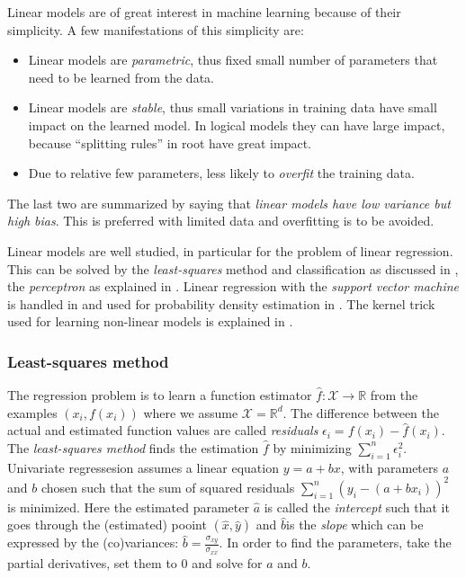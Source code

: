 Linear models are of great interest in machine learning because of their simplicity.
A few manifestations of this simplicity are:
\begin{itemize}
  \item Linear models are \emph{parametric}, thus fixed small number of parameters that need to be learned from the data.
  \item Linear models are \emph{stable}, thus small variations in training data have small impact on the learned model. In logical models they can have large impact, because ``splitting rules'' in root have great impact.
  \item Due to relative few parameters, less likely to \emph{overfit} the training data.
\end{itemize}

The last two are summarized by saying that \emph{linear models have low variance but high bias}.
This is preferred with limited data and overfitting is to be avoided.

Linear models are well studied, in particular for the problem of linear regression.
This can be solved by the \emph{least-squares} method and classification as discussed in , the \emph{perceptron} as explained in .
Linear regression with the \emph{support vector machine} is handled in  and used for probability density estimation in .
The kernel trick used for learning non-linear models is explained in .


\subsubsection{Least-squares method}\label{least-squares}
The regression problem is to learn a function estimator $\hat{f}:\mathcal{X} \to \mathbb{R}$ from the examples $(x_i, f(x_i))$ where we assume $\mathcal{X} = \mathbb{R}^d$.
The difference between the actual and estimated function values are called \emph{residuals} $\epsilon_i = f(x_i) - \hat{f}(x_i)$.
The \emph{least-squares method} finds the estimation $\hat{f}$ by minimizing $\sum_{i=1}^{n} \epsilon_i^2$.
Univariate regressesion assumes a linear equation $y = a + b x$, with parameters $a$ and $b$ chosen such that the sum of squared residuals $\sum_{i=1}^{n} (y_i - (a + b x_i))^2$ is minimized.
Here the estimated parameter $\hat{a}$ is called the \emph{intercept} such that it goes through the (estimated) pooint $(\hat{x},\hat{y})$ and $\hat{b}$is the \emph{slope} which can be expressed by the (co)variances: $\hat{b} = \frac{\sigma_{xy}}{\sigma_{xx}}$.
In order to find the parameters, take the partial derivatives, set them to $0$ and solve for $a$ and $b$.

